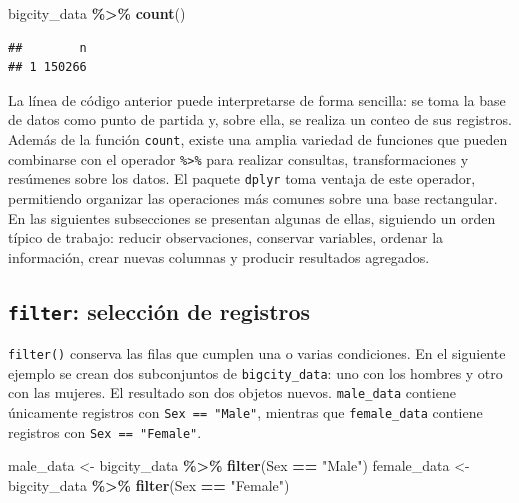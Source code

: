 \documentclass[
  spanish,
  12pt,
]{book}
\newenvironment{Shaded}{\begin{snugshade}}{\end{snugshade}}
\newcommand{\FunctionTok}[1]{\textcolor[rgb]{0.13,0.29,0.53}{\textbf{#1}}}
\newcommand{\NormalTok}[1]{#1}
\newcommand{\OtherTok}[1]{\textcolor[rgb]{0.56,0.35,0.01}{#1}}
\newcommand{\SpecialCharTok}[1]{\textcolor[rgb]{0.81,0.36,0.00}{\textbf{#1}}}
\newcommand{\StringTok}[1]{\textcolor[rgb]{0.31,0.60,0.02}{#1}}
\begin{document}
\begin{Shaded}
\begin{Highlighting}[]
\NormalTok{bigcity\_data }\SpecialCharTok{\%\textgreater{}\%}
  \FunctionTok{count}\NormalTok{()}
\end{Highlighting}
\end{Shaded}

\begin{verbatim}
##        n
## 1 150266
\end{verbatim}

La línea de código anterior puede interpretarse de forma sencilla: se toma la base de datos como punto de partida y, sobre ella, se realiza un conteo de sus registros. Además de la función \texttt{count}, existe una amplia variedad de funciones que pueden combinarse con el operador \texttt{\%\textgreater{}\%} para realizar consultas, transformaciones y resúmenes sobre los datos. El paquete \texttt{dplyr} toma ventaja de este operador, permitiendo organizar las operaciones más comunes sobre una base rectangular. En las siguientes subsecciones se presentan algunas de ellas, siguiendo un orden típico de trabajo: reducir observaciones, conservar variables, ordenar la información, crear nuevas columnas y producir resultados agregados.

\subsection{\texorpdfstring{\texttt{filter}: selección de registros}{filter: selección de registros}}\label{filter-seleccion-de-registros}

\texttt{filter()} conserva las filas que cumplen una o varias condiciones. En el siguiente ejemplo se crean dos subconjuntos de \texttt{bigcity\_data}: uno con los hombres y otro con las mujeres. El resultado son dos objetos nuevos. \texttt{male\_data} contiene únicamente registros con \texttt{Sex\ ==\ "Male"}, mientras que \texttt{female\_data} contiene registros con \texttt{Sex\ ==\ "Female"}.

\begin{Shaded}
\begin{Highlighting}[]
\NormalTok{male\_data }\OtherTok{\textless{}{-}}\NormalTok{ bigcity\_data }\SpecialCharTok{\%\textgreater{}\%}
  \FunctionTok{filter}\NormalTok{(Sex }\SpecialCharTok{==} \StringTok{"Male"}\NormalTok{)}
\NormalTok{female\_data }\OtherTok{\textless{}{-}}\NormalTok{ bigcity\_data }\SpecialCharTok{\%\textgreater{}\%}
  \FunctionTok{filter}\NormalTok{(Sex }\SpecialCharTok{==} \StringTok{"Female"}\NormalTok{)}
\end{Highlighting}
\end{Shaded}
\end{document}
